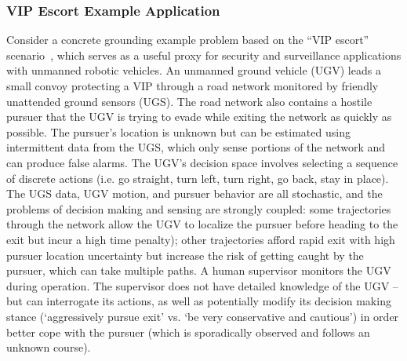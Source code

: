 \subsubsection{VIP Escort Example Application} \label{sec:vip_escort}
Consider a concrete grounding example problem based on the ``VIP escort'' scenario~\cite{Humphrey2012-lr}, which %
serves as a useful proxy for security and surveillance applications with unmanned robotic vehicles. An unmanned ground vehicle (UGV) leads a small convoy protecting a VIP through a road network monitored by friendly unattended ground sensors (UGS). The road network also contains a hostile pursuer that the UGV is trying to evade while exiting the network as quickly as possible. The pursuer's location is unknown but can be estimated using intermittent data from the UGS, which only sense portions of the network and can produce false alarms. The UGV's decision space involves selecting a sequence of discrete actions (i.e. go straight, turn left, turn right, go back, stay in place). The UGS data, UGV motion, and pursuer behavior are all stochastic, and the problems of decision making and sensing are strongly coupled: some trajectories through the network allow the UGV to localize the pursuer before heading to the exit but incur a high time penalty); other trajectories afford rapid exit with high pursuer location uncertainty but increase the risk of getting caught by the pursuer, which can take multiple paths. A human supervisor monitors the UGV during operation. The supervisor does not have detailed knowledge of the UGV -- but can interrogate its actions, as well as potentially modify its decision making stance (`aggressively pursue exit' vs. `be very conservative and cautious') %
in order better cope with the pursuer (which is sporadically observed and follows an unknown course). 

